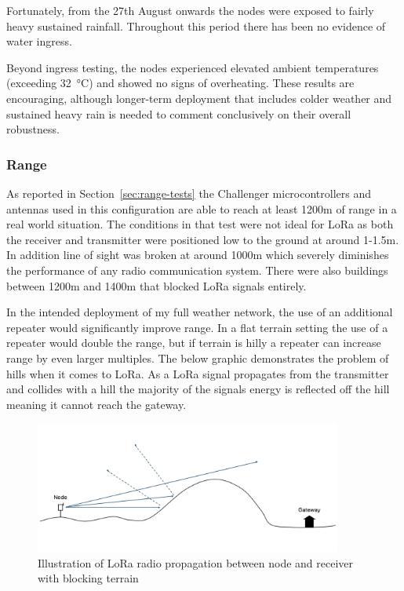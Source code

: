Fortunately, from the 27th August onwards the nodes were exposed to fairly heavy
sustained rainfall. Throughout this period there has been no evidence of water
ingress.

Beyond ingress testing, the nodes experienced elevated ambient temperatures
(exceeding \SI{32}{\degreeCelsius}) and showed no signs of overheating. These
results are encouraging, although longer-term deployment that includes colder
weather and sustained heavy rain is needed to comment conclusively on their
overall robustness.

\subsubsection{Range}\label{sec:range-eval}

As reported in Section~\ref{sec:range-tests} the Challenger microcontrollers and
antennas used in this configuration are able to reach at least 1200m of range in
a real world situation. The conditions in that test were not ideal for LoRa as
both the receiver and transmitter were positioned low to the ground at around
1-1.5m. In addition line of sight was broken at around 1000m which severely
diminishes the performance of any radio communication system. There were also
buildings between 1200m and 1400m that blocked LoRa signals entirely.

In the intended deployment of my full weather network, the use of an additional
repeater would significantly improve range. In a flat terrain setting the use of
a repeater would double the range, but if terrain is hilly a repeater can
increase range by even larger multiples. The below graphic demonstrates the
problem of hills when it comes to LoRa. As a LoRa signal propagates from the
transmitter and collides with a hill the majority of the signals energy is
reflected off the hill meaning it cannot reach the gateway.

\begin{figure}[H]
  \centering
  \includegraphics[width=0.9\textwidth]{contents/part-4/fig4/no-repeater.png}
  \caption{Illustration of LoRa radio propagation between node and receiver with blocking terrain}
  \label{fig:no-repeater}
\end{figure}


